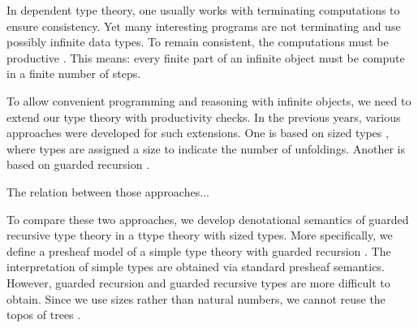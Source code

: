In dependent type theory, one usually works with terminating computations to ensure consistency.
Yet many interesting programs are not terminating and use possibly infinite data types.
To remain consistent, the computations must be productive \cite{Coquand93}.
This means: every finite part of an infinite object must be compute in a finite number of steps.

To allow convenient programming and reasoning with infinite objects, we need to extend our type theory with productivity checks.
In the previous years, various approaches were developed for such extensions.
One is based on sized types \cite{A-sized,AVW-normalization}, where types are assigned a size to indicate the number of unfoldings.
Another is based on guarded recursion \cite{atkey2013productive,BahrGM17}.

The relation between those approaches...

To compare these two approaches, we develop denotational semantics of guarded recursive type theory in a ttype theory with sized types.
More specifically, we define a presheaf model of a simple type theory with guarded recursion \cite{BMSS-synthetic}.
The interpretation of simple types are obtained via standard presheaf semantics.
However, guarded recursion and guarded recursive types are more difficult to obtain.
Since we use sizes rather than natural numbers, we cannot reuse the topos of trees \cite{BMSS-synthetic}.